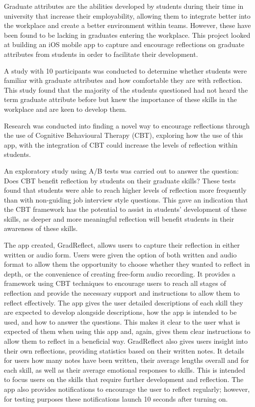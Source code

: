 \documentclass{l4proj}
\begin{document}
Graduate attributes are the abilities developed by students during their time in university that increase their employability, allowing them to integrate better into the workplace and create a better environment within teams. However, these have been found to be lacking in graduates entering the workplace. This project looked at building an iOS mobile app to capture and encourage reflections on graduate attributes from students in order to facilitate their development.

A study with 10 participants was conducted to determine whether students were familiar with graduate attributes and how comfortable they are with reflection. This study found that the majority of the students questioned had not heard the term graduate attribute before but knew the importance of these skills in the workplace and are keen to develop them.

Research was conducted into finding a novel way to encourage reflections through the use of Cognitive Behavioural Therapy (CBT), exploring how the use of this app, with the integration of CBT could increase the levels of reflection within students. 

An exploratory study using A/B tests was carried out to answer the question: Does CBT benefit reflection by students on their graduate skills? These tests found that students were able to reach higher levels of reflection more frequently than with non-guiding job interview style questions. This gave an indication that the CBT framework has the potential to assist in students’ development of these skills, as deeper and more meaningful reflection will benefit students in their awareness of these skills.

The app created, GradReflect, allows users to capture their reflection in either written or audio form. Users were given the option of both written and audio format to allow them the opportunity to choose whether they wanted to reflect in depth, or the convenience of creating free-form audio recording. It provides a framework using CBT techniques to encourage users to reach all stages of reflection and provide the necessary support and instructions to allow them to reflect effectively. The app gives the user detailed descriptions of each skill they are expected to develop alongside descriptions, how the app is intended to be used, and how to answer the questions. This makes it clear to the user what is expected of them when using this app and, again, gives them clear instructions to allow them to reflect in a beneficial way. GradReflect also gives users insight into their own reflections, providing statistics based on their written notes. It details for users how many notes have been written, their average lengths overall and for each skill, as well as their average emotional responses to skills. This is intended to focus users on the skills that require further development and reflection. The app also provides notifications to encourage the user to reflect regularly; however, for testing purposes these notifications launch 10 seconds after turning on.
\end{document}
